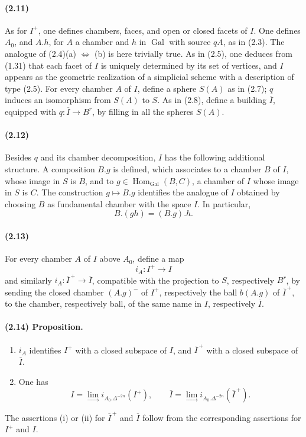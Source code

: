 \documentclass[10pt]{article}
\providecommand{\varinjlim}{\mathop{\mathrm{lim}}\limits_{\longrightarrow}}
\begin{document}
\paragraph{(2.11)} As for \(I^+\), one defines chambers, faces, and open or closed facets of \(I\). One defines \(A_0\), and \(A.h\), for \(A\) a chamber and \(h\) in \(\operatorname{Gal}\) with source \(qA\), as in (2.3). The analogue of (2.4)(a) \(\Leftrightarrow\) (b) is here trivially true. As in (2.5), one deduces from (1.31) that each facet of \(I\) is uniquely determined by its set of vertices, and \(I\) appears as the geometric realization of a simplicial scheme with a description of type (2.5). For every chamber \(A\) of \(I\), define a sphere \(S(A)\) as in (2.7); \(q\) induces an isomorphism from \(S(A)\) to \(S\). As in (2.8), define a building \(\overline I\), equipped with \(q:\overline I\to B^r\), by filling in all the spheres \(S(A)\).

\paragraph{(2.12)} Besides \(q\) and its chamber decomposition, \(I\) has the following additional structure. A composition \(B.g\) is defined, which associates to a chamber \(B\) of \(I\), whose image in \(S\) is \(B\), and to \(g\in\operatorname{Hom}_{\operatorname{Gal}}(B,C)\), a chamber of \(I\) whose image in \(S\) is \(C\). The construction \(g\mapsto B.g\) identifies the analogue of \(I\) obtained by choosing \(B\) as fundamental chamber with the space \(I\). In particular,
\[
B.(gh)=(B.g).h.
\]

\paragraph{(2.13)} For every chamber \(A\) of \(I\) above \(A_0\), define a map
\[
i_A:I^+\longrightarrow I
\]
and similarly \(i_A:\overline I^{\, +}\to\overline I\), compatible with the projection to \(S\), respectively \(B^r\), by sending the closed chamber \((A.g)^{-}\) of \(I^+\), respectively the ball \(b(A.g)\) of \(\overline I^{\, +}\), to the chamber, respectively ball, of the same name in \(I\), respectively \(\overline I\).

\paragraph{(2.14) Proposition.}
\begin{enumerate}[label=(\roman*)]
\item \(i_A\) identifies \(I^+\) with a closed subspace of \(I\), and \(\overline I^{\, +}\) with a closed subspace of \(\overline I\).
\item One has
\[
I=\varinjlim i_{A_0.\Delta^{-2n}}(I^+),
\qquad
\overline I=\varinjlim i_{A_0.\Delta^{-2n}}(\overline I^{\, +}).
\]
\end{enumerate}
The assertions (i) or (ii) for \(\overline I^{\, +}\) and \(\overline I\) follow from the corresponding assertions for \(I^+\) and \(I\).
\end{document}
